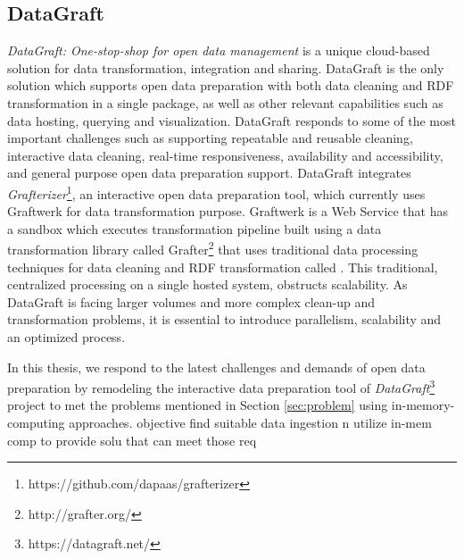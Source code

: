 \subsection{DataGraft}
\noindent \textit{DataGraft: One-stop-shop for open data management} \cite{onestopshotforopendata}  is a unique cloud-based solution for data transformation, integration and sharing. DataGraft is the only solution which supports open data preparation with both data cleaning and RDF transformation in a single package, as well as other relevant capabilities such as data hosting, querying and visualization. DataGraft responds to some of the most important challenges such as supporting repeatable and reusable cleaning, interactive data cleaning, real-time responsiveness, availability and accessibility, and general purpose open data preparation support. DataGraft integrates \textit{Grafterizer}\footnote{https://github.com/dapaas/grafterizer}, an interactive open data preparation tool, which currently uses Graftwerk for data transformation purpose. Graftwerk is a Web Service that has a sandbox which executes transformation pipeline built using a data transformation library called Grafter\footnote{http://grafter.org/} that uses traditional data processing techniques for data cleaning and RDF transformation called . This traditional, centralized processing on a single hosted system, obstructs scalability. As DataGraft is facing larger volumes and more complex clean-up and transformation problems, it is essential to introduce parallelism, scalability and an optimized process. 

In this thesis, we respond to the latest challenges and demands of open data preparation by remodeling the interactive data preparation tool of \textit{DataGraft}\footnote{https://datagraft.net/} project to met the problems mentioned in Section \ref{sec:problem} using in-memory-computing approaches.
objective
find suitable data ingestion n utilize in-mem comp to provide solu that can meet those req
